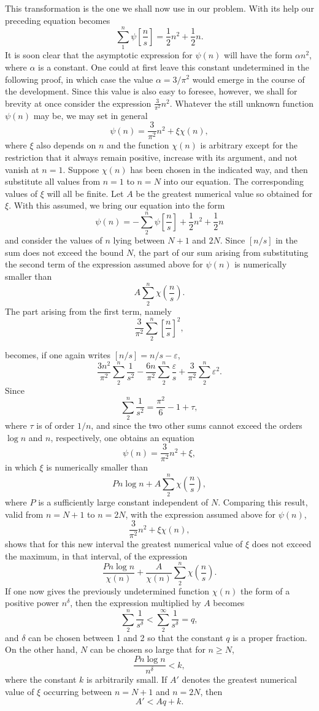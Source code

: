 \documentclass[11pt]{article}
\newcommand{\floor}[1]{\left[#1\right]}
\begin{document}
This transformation is the one we shall now use in our problem. With its help our preceding equation becomes
\[
 \sum_{1}^{n}\psi\floor{\frac ns}=\frac12 n^2+\frac12 n.
\]
It is soon clear that the asymptotic expression for $\psi(n)$ will have the form $\alpha n^2$, where $\alpha$ is a constant. One could at first leave this constant undetermined in the following proof, in which case the value $\alpha=3/\pi^2$ would emerge in the course of the development. Since this value is also easy to foresee, however, we shall for brevity at once consider the expression $\frac3{\pi^2}n^2$. Whatever the still unknown function $\psi(n)$ may be, we may set in general
\[
 \psi(n)=\frac3{\pi^2}n^2+\xi\chi(n),
\]
where $\xi$ also depends on $n$ and the function $\chi(n)$ is arbitrary except for the restriction that it always remain positive, increase with its argument, and not vanish at $n=1$. Suppose $\chi(n)$ has been chosen in the indicated way, and then substitute all values from $n=1$ to $n=N$ into our equation. The corresponding values of $\xi$ will all be finite. Let $A$ be the greatest numerical value so obtained for $\xi$. With this assumed, we bring our equation into the form
\[
 \psi(n)=-\sum_{2}^{n}\psi\floor{\frac ns}+\frac12 n^2+\frac12 n
\]
and consider the values of $n$ lying between $N+1$ and $2N$. Since $\floor{n/s}$ in the sum does not exceed the bound $N$, the part of our sum arising from substituting the second term of the expression assumed above for $\psi(n)$ is numerically smaller than
\[
 A\sum_{2}^{n}\chi\left(\frac ns\right).
\]
The part arising from the first term, namely
\[
 \frac3{\pi^2}\sum_{2}^{n}\floor{\frac ns}^{2},
\]

becomes, if one again writes $\floor{n/s}=n/s-\varepsilon$,
\[
 \frac{3n^2}{\pi^2}\sum_{2}^{n}\frac1{s^2}
 -\frac{6n}{\pi^2}\sum_{2}^{n}\frac{\varepsilon}{s}
 +\frac3{\pi^2}\sum_{2}^{n}\varepsilon^2.
\]
Since
\[
 \sum_{2}^{n}\frac1{s^2}=\frac{\pi^2}{6}-1+\tau,
\]
where $\tau$ is of order $1/n$, and since the two other sums cannot exceed the orders $\log n$ and $n$, respectively, one obtains an equation
\[
 \psi(n)=\frac3{\pi^2}n^2+\xi,
\]
in which $\xi$ is numerically smaller than
\[
 Pn\log n+A\sum_{2}^{n}\chi\left(\frac ns\right),
\]
where $P$ is a sufficiently large constant independent of $N$. Comparing this result, valid from $n=N+1$ to $n=2N$, with the expression assumed above for $\psi(n)$,
\[
 \frac3{\pi^2}n^2+\xi\chi(n),
\]
shows that for this new interval the greatest numerical value of $\xi$ does not exceed the maximum, in that interval, of the expression
\[
 \frac{Pn\log n}{\chi(n)}+\frac{A}{\chi(n)}\sum_{2}^{n}\chi\left(\frac ns\right).
\]
If one now gives the previously undetermined function $\chi(n)$ the form of a positive power $n^\delta$, then the expression multiplied by $A$ becomes
\[
 \sum_{2}^{n}\frac1{s^\delta}<\sum_{2}^{\infty}\frac1{s^\delta}=q,
\]
and $\delta$ can be chosen between 1 and 2 so that the constant $q$ is a proper fraction. On the other hand, $N$ can be chosen so large that for $n\geq N$,
\[
 \frac{Pn\log n}{n^\delta}<k,
\]
where the constant $k$ is arbitrarily small. If $A'$ denotes the greatest numerical value of $\xi$ occurring between $n=N+1$ and $n=2N$, then
\[
 A'<Aq+k.
\]
\end{document}
